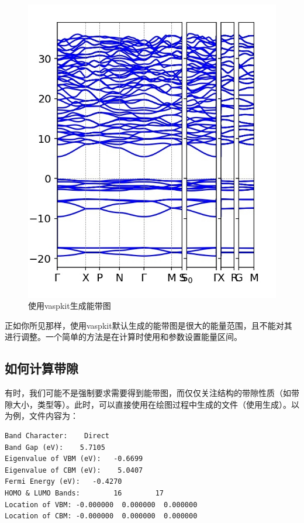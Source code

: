 \begin{figure}
    \centering
    \includegraphics[width=1\linewidth]{VASP计算/能带计算/能带绘图与后处理/fig/vaspkit自动生成能带图.png}
    \caption{使用vaspkit生成能带图}
    \label{fig:使用vaspkit生成能带图}
\end{figure}

\begin{extend}
    正如你所见那样，使用vaspkit默认生成的能带图是很大的能量范围，且不能对其进行调整。一个简单的方法是在计算时使用和参数设置能量区间。
\end{extend}

\subsection{如何计算带隙}\label{subsec:能带绘图与后处理-如何计算带隙}

有时，我们可能不是强制要求需要得到能带图，而仅仅关注结构的带隙性质（如带隙大小，类型等）。此时，可以直接使用在绘图过程中生成的文件（使用生成）。以为例，文件内容为：

\begin{lstlisting}[caption=BAND\_GAP]
Band Character:    Direct
Band Gap (eV):    5.7105
Eigenvalue of VBM (eV):   -0.6699
Eigenvalue of CBM (eV):    5.0407
Fermi Energy (eV):   -0.4270
HOMO & LUMO Bands:        16        17
Location of VBM: -0.000000  0.000000  0.000000
Location of CBM: -0.000000  0.000000  0.000000
\end{lstlisting}

